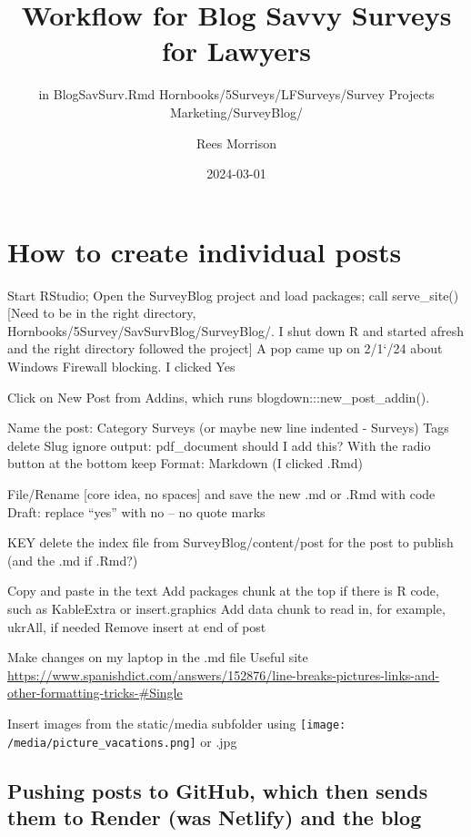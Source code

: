 \documentclass[
]{article}
\title{Workflow for Blog Savvy Surveys for Lawyers}
\subtitle{in BlogSavSurv.Rmd Hornbooks/5Surveys/LFSurveys/Survey
Projects Marketing/SurveyBlog/}
\author{Rees Morrison}
\date{2024-03-01}
\begin{document}
\maketitle

\hypertarget{how-to-create-individual-posts}{%
\section{How to create individual
posts}\label{how-to-create-individual-posts}}

Start RStudio; Open the SurveyBlog project and load packages; call
serve\_site() {[}Need to be in the right directory,
Hornbooks/5Survey/SavSurvBlog/SurveyBlog/. I shut down R and started
afresh and the right directory followed the project{]} A pop came up on
2/1`/24 about Windows Firewall blocking. I clicked Yes

Click on New Post from Addins, which runs blogdown:::new\_post\_addin().

Name the post: Category Surveys (or maybe new line indented - Surveys)
Tags delete Slug ignore output: pdf\_document should I add this? With
the radio button at the bottom keep Format: Markdown (I clicked .Rmd)

File/Rename {[}core idea, no spaces{]} and save the new .md or .Rmd with
code Draft: replace ``yes'' with no -- no quote marks

KEY delete the index file from SurveyBlog/content/post for the post to
publish (and the .md if .Rmd?)

Copy and paste in the text Add packages chunk at the top if there is R
code, such as KableExtra or insert.graphics Add data chunk to read in,
for example, ukrAll, if needed Remove \newpage insert at end of post

Make changes on my laptop in the .md file Useful site
\url{https://www.spanishdict.com/answers/152876/line-breaks-pictures-links-and-other-formatting-tricks-\#Single}

Insert images from the static/media subfolder using
\texttt{[image: /media/picture\_vacations.png]} or .jpg

\hypertarget{pushing-posts-to-github-which-then-sends-them-to-render-was-netlify-and-the-blog}{%
\subsection{Pushing posts to GitHub, which then sends them to Render
(was Netlify) and the
blog}\label{pushing-posts-to-github-which-then-sends-them-to-render-was-netlify-and-the-blog}}
\end{document}
